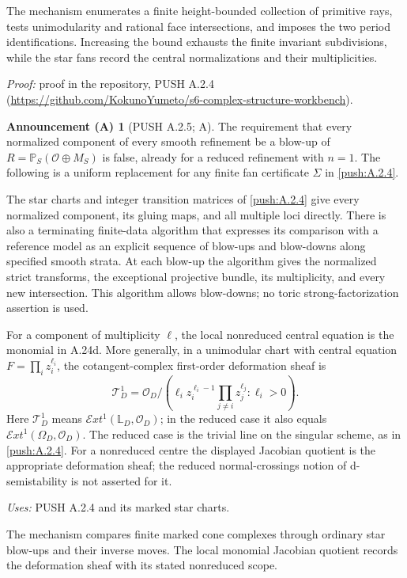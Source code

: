 \documentclass[11pt,a4paper]{article}
\theoremstyle{plain}
\theoremstyle{definition}
\newtheorem{announcement}[theorem]{Announcement (A)}
\begin{document}
The mechanism enumerates a finite height-bounded collection of primitive rays, tests unimodularity and rational face intersections, and imposes the two period identifications. Increasing the bound exhausts the finite invariant subdivisions, while the star fans record the central normalizations and their multiplicities.

\noindent\emph{Proof:} proof in the repository, PUSH A.2.4 (\url{https://github.com/KokunoYumeto/s6-complex-structure-workbench}).

\begin{announcement}[PUSH A.2.5; A]\label{push:A.2.5}
The requirement that every normalized component of every
smooth refinement be a blow-up of
$R=\mathbb P_S(\mathcal O\oplus M_S)$ is false, already
for a reduced refinement with $n=1$.
The following is a uniform replacement for any finite
fan certificate $\Sigma$ in \ref{push:A.2.4}.

The star charts and integer transition matrices of \ref{push:A.2.4}
give every normalized component, its gluing maps, and
all multiple loci directly. There is also a terminating
finite-data algorithm that expresses its comparison
with a reference model as an explicit sequence of
blow-ups and blow-downs along specified smooth strata.
At each blow-up the algorithm gives the normalized
strict transforms, the exceptional projective bundle,
its multiplicity, and every new intersection.
This algorithm allows blow-downs; no toric
strong-factorization assertion is used.

For a component of multiplicity $\ell$, the local
nonreduced central equation is the monomial in A.24d.
More generally, in a unimodular chart with central
equation $F=\prod_i z_i^{\ell_i}$, the cotangent-complex
first-order deformation sheaf is
\[
 \mathcal T^1_D
  =\mathcal O_D\Big/
    \left(\ell_i z_i^{\ell_i-1}
          \prod_{j\ne i}z_j^{\ell_j}:\ell_i>0\right).
 \tag{A.25a}
\]
Here $\mathcal T^1_D$ means
$\mathcal Ext^1(\mathbb L_D,\mathcal O_D)$; in the
reduced case it also equals
$\mathcal Ext^1(\Omega_D,\mathcal O_D)$.
The reduced case is the trivial line on the singular
scheme, as in \ref{push:A.2.4}. For a nonreduced centre the displayed
Jacobian quotient is the appropriate deformation sheaf;
the reduced normal-crossings notion of d-semistability
is not asserted for it.
\end{announcement}
\noindent\emph{Uses:} PUSH A.2.4 and its marked star charts.\par

The mechanism compares finite marked cone complexes through ordinary star blow-ups and their inverse moves. The local monomial Jacobian quotient records the deformation sheaf with its stated nonreduced scope.
\end{document}
